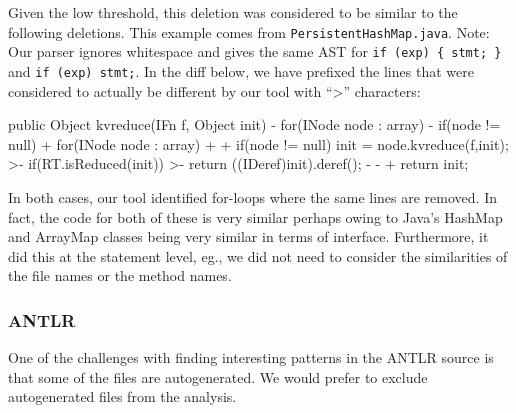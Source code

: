 Given the low threshold, this deletion was considered to be similar to the
following deletions. This example comes from {\tt PersistentHashMap.java}.
Note: Our parser ignores whitespace and gives the same AST for \verb|if (exp) { stmt; }|
and \verb|if (exp) stmt;|. In the diff below, we have prefixed the
lines that were considered to actually be different by our tool with ``>''
characters:

\begin{java}
 public Object kvreduce(IFn f, Object init){
-    for(INode node : array){
-        if(node != null){
+    for(INode node : array)
+        {
+        if(node != null)
             init = node.kvreduce(f,init);
>-                if(RT.isReduced(init))
>-                        return ((IDeref)init).deref();
-               }
-           }
+        }
     return init;
 }
\end{java}

In both cases, our tool identified for-loops where the same lines are removed.
In fact, the code for both of these is very similar perhaps owing to Java's
HashMap and ArrayMap classes being very similar in terms of interface.
Furthermore, it did this at the statement level, eg., we did not need to
consider the similarities of the file names or the method names.

\subsubsection{ANTLR}


One of the challenges with finding interesting patterns in the ANTLR source is
that some of the files are autogenerated. We would prefer to exclude
autogenerated files from the analysis.

